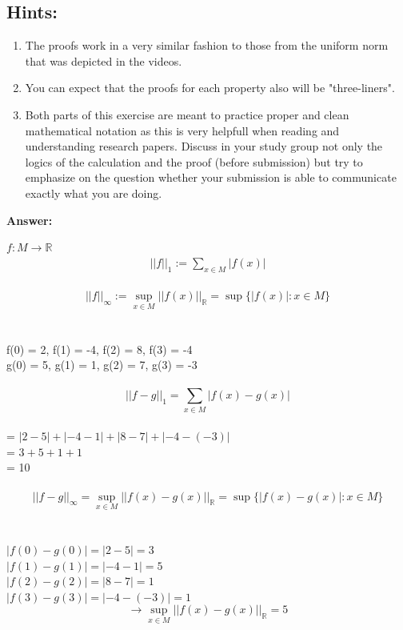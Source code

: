 \documentclass{WeSTassignment}
\begin{document}
\subsection{Hints:}
\begin{enumerate}
\item The proofs work in a very similar fashion to those from the uniform norm that was depicted in the videos. 

\item You can expect that the proofs for each property also will be "three-liners".

\item Both parts of this exercise are meant to practice proper and clean mathematical notation as this is very helpfull when reading and understanding research papers. Discuss in your study group not only the logics of the calculation and the proof (before submission) but try to emphasize on the question whether your submission is able to communicate exactly what you are doing. 

\end{enumerate}
\newpage
\textbf{Answer:}

$f: M \rightarrow \mathbb{R}$\\
\noindent
\begin{align*}
||f||_1 := \sum_{x \in M}{|f(x)|}
\end{align*}\\
\[||f||_\infty := \sup_{x \in M} ||f(x)||_\mathbb{R} = \sup \{|f(x)| : x \in M\}\]\\
\\
f(0) = 2, f(1) = -4, f(2) = 8, f(3) = -4\\
g(0) = 5, g(1) = 1, g(2) = 7, g(3) = -3\\
\\
\[||f-g||_1 = \sum_{x \in M}{|f(x) - g(x)|}\]\\
= $| 2-5| + |-4 -1| + |8-7| + |-4 - (-3)|$\\
= $ 3 + 5 + 1 + 1$\\
= 10\\
\\
\[||f-g||_\infty = \sup_{x \in M} ||f(x) - g(x)||_\mathbb{R} = \sup \{|f(x) - g(x)| : x\in M\}\]\\
\\
$|f(0) - g(0)| = |2 - 5| = 3$\\
$|f(1) - g(1)| = |-4 - 1| = 5$\\
$|f(2) - g(2)| = |8 - 7| = 1$ \\
$|f(3) - g(3)| = |-4 - (-3)| = 1$\\
\[\rightarrow \sup_{x \in M} ||f(x) - g(x)||_\mathbb{R} = 5\]\\
\\
\end{document}
